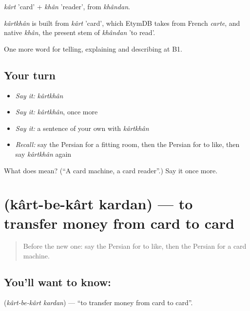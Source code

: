 \emph{kârt} 'card' + \emph{khân} 'reader', from \emph{khândan}.

\begin{cousinweb}
\emph{kârtkhân} is built from \emph{kârt} 'card', which EtymDB takes from French \emph{carte}, and native \emph{khân}, the present stem of \emph{khândan} 'to read'.
\end{cousinweb}

\begin{grammarlens}[title={What you've built}]
One more word for telling, explaining and describing at B1.
\end{grammarlens}

\subsection*{Your turn}
\begin{itemize}
\raggedright
  \item \emph{Say it:} \emph{kârtkhân}
  \item \emph{Say it:} \emph{kârtkhân}, once more
  \item \emph{Say it:} a sentence of your own with \emph{kârtkhân}
  \item \emph{Recall:} say the Persian for a fitting room, then the Persian for to like, then say \emph{kârtkhân} again
\end{itemize}

\begin{tcolorbox}[breakable,colback=teal!4,colframe=teal!35!black,title={Before you move on}]
What does  mean? (\textquotedblleft{}A card machine, a card reader\textquotedblright{}.) Say it once more.
\end{tcolorbox}
\section[\texorpdfstring{\fa{کارت} \fa{به} \fa{کارت} \fa{کردن} (kârt-be-kârt kardan)}{کارت به کارت کردن (kârt-be-kârt kardan)}]{    (kârt-be-kârt kardan) — to transfer money from card to card}

\label{lesson:FA-C461-kart-be-kart-kardan}



\begin{quote}
Before the new one: say the Persian for to like, then the Persian for a card machine.
\end{quote}

\subsection*{You'll want to know:    }
\textbf{   } (\emph{kârt-be-kârt kardan}) — \textquotedblleft{}to transfer money from card to card\textquotedblright{}.

